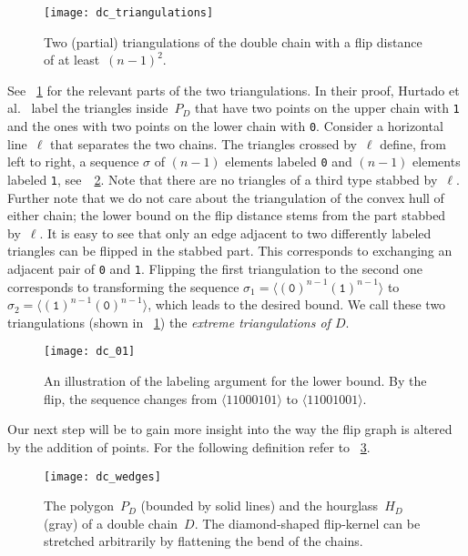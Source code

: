 \documentclass[11pt,a4paper]{article}
\begin{document}
\begin{figure}
\centering
\texttt{[image: dc\_triangulations]}
\caption{Two (partial) triangulations of the double chain with a flip distance of at least~\mbox{$(n-1)^2$}.}
\label{fig_dc_triangulations}
\end{figure}

See \figurename~\ref{fig_dc_triangulations} for the relevant parts of the two triangulations.
In their proof, Hurtado et al.~\cite{hurtado_noy_urrutia} label the triangles inside~$P_D$ that have two points on the upper chain with \texttt{1} and the ones with two points on the lower chain with \texttt{0}.
Consider a horizontal line~$\ell$ that separates the two chains.
The triangles crossed by~$\ell$ define, from left to right, a sequence $\sigma$ of $(n-1)$ elements labeled \texttt{0} and $(n-1)$ elements labeled \texttt{1}, see~\figurename~\ref{fig_dc_01}.
Note that there are no triangles of a third type stabbed by~$\ell$.
Further note that we do not care about the triangulation of the convex hull of either chain; the lower bound on the flip distance stems from the part stabbed by~$\ell$.
It is easy to see that only an edge adjacent to two differently labeled triangles can be flipped in the stabbed part.
This corresponds to exchanging an adjacent pair of \texttt{0} and \texttt{1}.
Flipping the first triangulation to the second one corresponds to transforming the sequence $\sigma_1 = \langle (\texttt{0})^{n-1} (\texttt{1})^{n-1} \rangle$ to $\sigma_2 = \langle (\texttt{1})^{n-1} (\texttt{0})^{n-1} \rangle$, which leads to the desired bound.
We call these two triangulations (shown in \figurename~\ref{fig_dc_triangulations}) the \emph{extreme triangulations of $D$}.

\begin{figure}
\centering
\texttt{[image: dc\_01]}
\caption{An illustration of the labeling argument for the lower bound.
By the flip, the sequence changes from $\langle 11000101 \rangle$ to $\langle 11001001 \rangle$.}
\label{fig_dc_01}
\end{figure}

Our next step will be to gain more insight into the way the flip graph is altered by the addition of points.
For the following definition refer to \figurename~\ref{fig_dc_wedges}.

\begin{figure}
\centering
\texttt{[image: dc\_wedges]}
\caption{The polygon~$P_D$ (bounded by solid lines) and the hourglass~$H_D$ (gray) of a double chain~$D$. The diamond-shaped flip-kernel can be stretched arbitrarily by flattening the bend of the chains.}
\label{fig_dc_wedges}
\end{figure}
\end{document}
